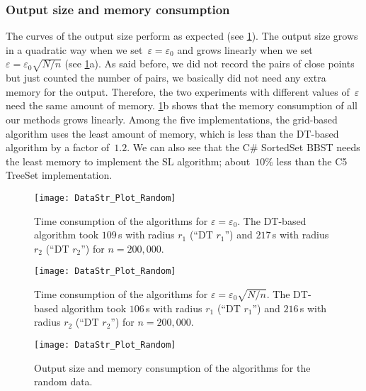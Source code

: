 \subsubsection{Output size and memory consumption}
The curves of the output size perform as expected
(see \fig\ref{fig:DataStr_RandomMemory}). 
The output size grows in a quadratic way
when we set~$\varepsilon =\varepsilon _{0}$ 
and grows linearly 
when we set~$\varepsilon =\varepsilon_{0}\sqrt{N/n}$
(see \fig\ref{fig:DataStr_RandomMemory}a). 
As said before, we did not record 
the pairs of close points 
but just counted the number of pairs, 
we basically did not need any extra memory for the output.
Therefore, the two experiments with different values 
of~$\varepsilon$ need the same amount of memory. 
\fig\ref{fig:DataStr_RandomMemory}b 
shows that the memory consumption of all our 
methods grows linearly. 
Among the five implementations, 
the grid-based algorithm uses 
the least amount of memory, 
which is less than the DT-based algorithm 
by a factor of~$1.2$. 
We can also see that the C\# SortedSet BBST needs 
the least memory to implement the SL algorithm; 
about~$10\%$ less than the C5 TreeSet implementation. 


\begin{figure}[tb]	
\centering
\texttt{[image: DataStr\_Plot\_Random]}
\vspace{-3mm}
\caption{Time consumption of the algorithms for 
	$\varepsilon=\varepsilon_{0}$. 
	The DT-based algorithm took 
	$109\,$s with radius $r_1$ (``DT $r_1$'') and  
	$217\,$s with radius $r_2$ (``DT $r_2$'') 
	for $n=200,000$.}
\label{fig:DataStr_RandomTimeEpsilonFix}
%
\vspace{8mm}
%
\centering
\texttt{[image: DataStr\_Plot\_Random]}
\vspace{-3mm}
\caption{Time consumption of the algorithms for
	$\varepsilon=\varepsilon_{0} \sqrt{N/n}$. 
	The DT-based algorithm took 
	$106\,$s with radius $r_1$ (``DT $r_1$'') and  
	$216\,$s with radius $r_2$ (``DT $r_2$'') for 
	$n=200{,}000$.}
\label{fig:DataStr_RandomTimeEpsilonDecrease}
%	
\vspace{8mm}
%
\centering
\texttt{[image: DataStr\_Plot\_Random]}
\vspace{-3mm}
\caption{Output size and memory consumption 
	of the 	algorithms for the random data.}
\label{fig:DataStr_RandomMemory}	
\end{figure}


